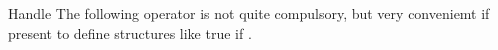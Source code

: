 \begin{ccRefConcept}{Handle}
The following operator is not quite compulsory, but very conveniemt if 
present to define structures like 
 {true if 
 .}





\ccHasModels
{}








\end{ccRefConcept}


